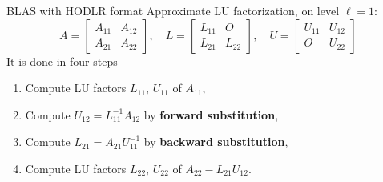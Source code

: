 \documentclass[aspectratio=169,xcolor=dvipsnames]{beamer}
\begin{document}
\begin{frame}{BLAS with HODLR format}
	Approximate LU factorization, on level $\ell = 1$:
	\[
	A = \begin{bmatrix}
		A_{11} & A_{12} \\
		A_{21} & A_{22}
	\end{bmatrix}, \quad L = \begin{bmatrix}
		L_{11} & O \\
		L_{21} & L_{22}
	\end{bmatrix}, \quad U = \begin{bmatrix}
		U_{11} & U_{12} \\
		O & U_{22}
	\end{bmatrix}
	\]
	It is done in four steps
	\begin{enumerate}
		\item<2-> Compute LU factors $L_{11}$, $U_{11}$ of $A_{11}$,
		\item<3-> Compute $U_{12} = L_{11}^{-1} A_{12}$ by \textbf{forward substitution},
		\item<4-> Compute $L_{21} = A_{21} U_{11}^{-1}$ by \textbf{backward substitution},
		\item<5-> Compute LU factors $L_{22}$, $U_{22}$ of $A_{22} - L_{21}U_{12}$. 
	\end{enumerate}
	
	
\end{frame}
\end{document}
